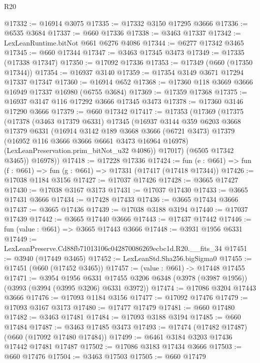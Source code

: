 \begin{lexlean}{R20}
\begin{coremodule}
@17332 := @16914 @3075
@17335 := @17332 @3150 @17295 @3666
@17336 := @6535 @3684
@17337 := @660 @17336
@17338 := @3463 @17337
@17342 := LexLeanRuntime.bitNot @661 @6276 @4086
@17344 := @6277 @17342 @3465
@17345 := @660 @17344
@17347 := @3463 @17345 @3473
@17349 := @17335 (@17338 @17347)
@17350 := @17092 @17336
@17353 := @17349 (@660 (@17350 @17344))
@17354 := @16937 @3140
@17359 := @17354 @3149 @3671 @17294 @17337 @17347
@17360 := @16914 @652
@17368 := @17360 @118 @3669 @3666 @16949 @17337 @16980 (@6755 @3684)
@17369 := @17359 @17368
@17375 := @16937 @3147 @116 @17292 @3666 @17345 @3473
@17378 := @17360 @3146 @17290 @3666
@17379 := @660 @17342
@17417 := @17353
    (@17369
      (@17375
        (@17378
          (@3463 @17379 @6331)
          @17345
          (@16937
            @3144
            @359
            @6203
            @3668
            @17379
            @6331
            (@16914
              @3142
              @189
              @3668
              @3666
              (@6721 @3473)
              @17379
              (@16952 @116 @3666 @3666 @6661 @3473 @16964 @16978)
              (LexLeanPreservation.prim_bitNot_u32 @4086))
            @17017)
          (@6505 @17342 @3465))
        @16978))
@17418 := @17228 @17336
@17424 := fun (e : @661) => fun (f : @661) => fun (g : @661) => @17331 (@17417 (@17418 @17344))
@17426 := @17038 @1184 @3156
@17427 := @17037 @17426
@17428 := @3665 @17427
@17430 := @17038 @3167 @3173
@17431 := @17037 @17430
@17433 := @3665 @17431 @3666
@17434 := @17428 @17433
@17436 := @3665 @17434 @3666
@17437 := @3665 @17436
@17439 := @17038 @3188 @3194
@17440 := @17037 @17439
@17442 := @3665 @17440 @3666
@17443 := @17437 @17442
@17446 := fun (value : @661) => @3665 @17443 @3666
@17448 := @3931 @1956 @6331
@17449 := LexLeanPreserve.Cd88fb71013106c042870086269ecbc1d.R20.__fits_34
@17451 := @3940 (@17449 @3465)
@17452 := LexLeanStd.Sha256.bigSigma0
@17455 := @17451 (@660 (@17452 @3465))
@17457 := (value : @661) -> @17448 @17455
@17471 := @3954
    @1956
    @6331
    @17455
    @3206
    @6348
    (@3978 (@3987 @1956))
    (@3993 (@3994 (@3995 @3206) @6331 @3972))
@17474 := @17086 @3204 @17443 @3666
@17476 := @17093 @1184 @3156
@17477 := @17092 @17476
@17479 := @17093 @3167 @3173
@17480 := @17477 @17479
@17481 := @660 @17480
@17482 := @3463 @17481
@17484 := @17093 @3188 @3194
@17485 := @660 @17484
@17487 := @3463 @17485 @3473
@17493 := @17474 (@17482 @17487) (@660 (@17092 @17480 @17484))
@17499 := @6461 @3184 @3203 @17436 @17442 @17481 @17487
@17502 := @17086 @3183 @17434 @3666
@17503 := @660 @17476
@17504 := @3463 @17503
@17505 := @660 @17479

\end{coremodule}
\end{lexlean}
